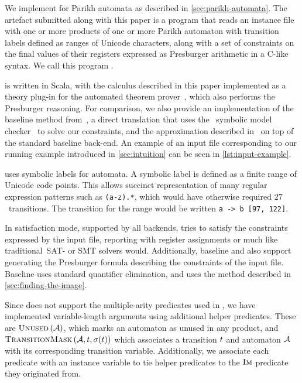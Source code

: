 
We implement \Calculus{} for Parikh automata as described in
\cref{sec:parikh-automata}. The artefact submitted along with this paper is a
program that reads an instance file with one or more products of one or more
Parikh automaton with transition labels defined as ranges of Unicode characters,
along with a set of constraints on the final values of their registers expressed
as Presburger arithmetic in a C-like syntax. We call this program
\Catra.

\Catra{} is written in Scala, with the calculus described in this paper
implemented as a theory plug-in for the \Princess{} automated theorem
prover~\cite{princess}, which also performs the Presburger reasoning. For
comparison, we also provide an implementation of the baseline method
from~\cite{generate-parikh-image}, a direct translation that uses the~\Nuxmv{}
symbolic model checker~\cite{nuxmv} to solve our constraints, and the
approximation described in~\cite{approximate-parikh} on top of the standard
baseline back-end. An example of an input file corresponding to our running
example introduced in \cref{sec:intuition} can be seen in
\cref{lst:input-example}.

\Catra{} uses symbolic labels for automata. A symbolic label is defined as a
finite range of Unicode code points. This allows succinct representation of many
regular expression patterns such as \lstinline{(a-z).*}, which would have
otherwise required $27$~transitions. The transition for the range would be
written \lstinline{a -> b [97, 122]}.

In satisfaction mode, supported by all backends, \Catra{} tries to satisfy the
constraints expressed by the input file, reporting \Sat{} with register
assignments or \Unsat{} much like traditional~SAT- or SMT solvers would.
Additionally, baseline and \Calculus{} also support generating the Presburger
formula describing the constraints of the input file. Baseline uses standard
quantifier elimination, and \Calculus{} uses the method described in
\cref{sec:finding-the-image}.

Since \Princess{} does not support the multiple-arity predicates used in
\Calculus{}, we have implemented variable-length arguments using additional
helper predicates. These are $\operatorname{\textsc{Unused}}{}(\mathcal{A})$, which marks an automaton
as unused in any product, and $\operatorname{\textsc{TransitionMask}}{}(\mathcal{A}, t,
\operatorname{\sigma}(t))$ which associates a transition $t$ and automaton
$\mathcal{A}$ with its corresponding transition variable. Additionally, we
associate each predicate with an instance variable to tie helper predicates
to the $\operatorname{\textsc{Im}}$ predicate they originated from.

